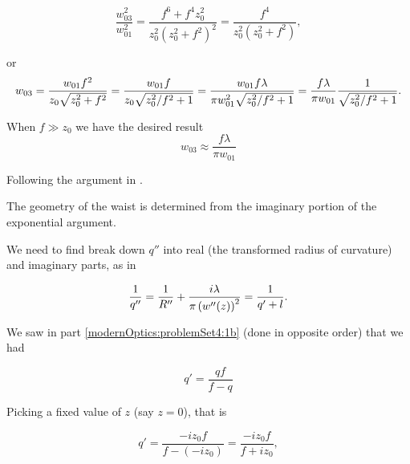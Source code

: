 {\begin{dmath}\label{eqn:problemSet4Problem1:260}
\frac{w_{03}^2}{w_{01}^2} 
= \frac{
f^6 + f^4 z_0^2
}{z_0^2 \left(z_0^2 + f^2\right)^2 }
= 
\frac{f^4}{z_0^2\left(z_0^2 + f^2\right) },
\end{dmath}

or
\begin{dmath}\label{eqn:problemSet4Problem1:280}
w_{03}
= 
\frac{w_{01} f^2}{z_0 \sqrt{z_0^2 + f^2} }
= 
\frac{w_{01} f}{z_0 \sqrt{z_0^2/f^2 + 1} }
=
\frac{w_{01} f \lambda}{\pi w_{01}^2 \sqrt{z_0^2/f^2 + 1} }
=
\frac{f \lambda}{\pi w_{01}} \inv{\sqrt{z_0^2/f^2 + 1} }.
\end{dmath}

When $f \gg z_0$ we have the desired result
\begin{dmath}\label{eqn:problemSet4Problem1:300}
\boxed{
w_{03}
\approx
\frac{f \lambda}{\pi w_{01}} 
}
\end{dmath}


Following the argument in \citep{yariv1989quantum}.

The geometry of the waist is determined from the imaginary portion of the exponential argument.
%
%

We need to find break down $q''$ into real (the transformed radius of curvature) and imaginary parts, as in

\begin{equation}\label{eqn:problemSet4Problem1:340}
\frac{1}{q''} = \frac{1}{R''} + \frac{i \lambda}{\pi \left(w''(z) \right)^2 }
=
\frac{1}{q' + l}.
\end{equation}

We saw in part \ref{modernOptics:problemSet4:1b} (done in opposite order) that we had

\begin{dmath}\label{eqn:problemSet4Problem1:360}
q' = \frac{q f}{f - q}
\end{dmath}

Picking a fixed value of $z$ (say $z = 0$), that is

\begin{dmath}\label{eqn:problemSet4Problem1:380}
q' = \frac{- i z_0 f}{ f - (-i z_0)} = \frac{-i z_0 f}{f + i z_0},
\end{dmath}

}
